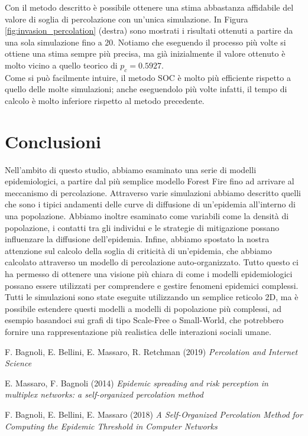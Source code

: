 \documentclass{article}
\begin{document}
    Con il metodo descritto è possibile ottenere una stima abbastanza affidabile del valore di soglia di percolazione
    con un'unica simulazione. In Figura \ref{fig:invasion_percolation} (destra) sono mostrati i risultati ottenuti a
    partire da una sola simulazione fino a 20. Notiamo che eseguendo il processo più volte si ottiene una stima sempre
    più precisa, ma già inizialmente il valore ottenuto è molto vicino a quello teorico di $p_c = 0.5927$.\\
    Come si può facilmente intuire, il metodo SOC è molto più efficiente rispetto a quello delle molte simulazioni;
    anche eseguendolo più volte infatti, il tempo di calcolo è molto inferiore rispetto al metodo precedente.

    \section{Conclusioni}
    Nell'ambito di questo studio, abbiamo esaminato una serie di modelli epidemiologici, a partire dal più semplice modello
    Forest Fire fino ad arrivare al meccanismo di percolazione. Attraverso varie simulazioni abbiamo descritto quelli che
    sono i tipici andamenti delle curve di diffusione di un'epidemia all'interno di una popolazione. Abbiamo inoltre
    esaminato come variabili come la densità di popolazione, i contatti tra gli individui e le strategie di mitigazione
    possano influenzare la diffusione dell'epidemia. Infine, abbiamo spostato la nostra attenzione sul calcolo della soglia
    di criticità di un'epidemia, che abbiamo calcolato attraverso un modello di percolazione auto-organizzato.
    Tutto questo ci ha permesso di ottenere una visione più chiara di come i modelli epidemiologici possano essere utilizzati
    per comprendere e gestire fenomeni epidemici complessi.\\
    Tutti le simulazioni sono state eseguite utilizzando un semplice reticolo 2D, ma è possibile estendere questi modelli
    a modelli di popolazione più complessi, ad esempio basandoci sui grafi di tipo Scale-Free o Small-World, che potrebbero
    fornire una rappresentazione più realistica delle interazioni sociali umane.

    \begin{thebibliography}{9}
F. Bagnoli, E. Bellini, E. Massaro, R. Retchman (2019) \emph{Percolation and Internet Science}

E. Massaro, F. Bagnoli (2014) \emph{Epidemic spreading and risk perception in multiplex networks: a self-organized percolation method}

F. Bagnoli, E. Bellini, E. Massaro (2018) \emph{A Self-Organized Percolation Method for Computing the Epidemic Threshold in Computer Networks}

\end{thebibliography}
\end{document}
